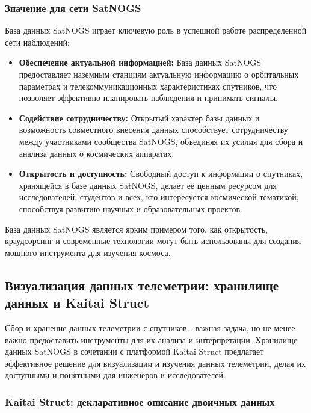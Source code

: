 \documentclass[12pt, a4paper]{extreport}
\begin{document}
\subsubsection{Значение для сети SatNOGS}

База данных SatNOGS играет ключевую роль в успешной работе распределенной сети наблюдений:

\begin{itemize}
\item \textbf{Обеспечение актуальной информацией:} База данных SatNOGS предоставляет наземным станциям актуальную информацию о орбитальных параметрах и телекоммуникационных характеристиках спутников, что позволяет эффективно планировать наблюдения и принимать сигналы.
\item \textbf{Содействие сотрудничеству:} Открытый характер базы данных и возможность совместного внесения данных способствует сотрудничеству между участниками сообщества SatNOGS, объединяя их усилия для сбора и анализа данных о космических аппаратах.
\item \textbf{Открытость и доступность:} Свободный доступ к информации о спутниках, хранящейся в базе данных SatNOGS, делает её ценным ресурсом для исследователей, студентов и всех, кто интересуется космической тематикой, способствуя развитию научных и образовательных проектов.
\end{itemize} 

База данных SatNOGS является ярким примером того, как открытость, краудсорсинг и современные технологии могут быть использованы для создания мощного инструмента для изучения космоса.

\subsection{Визуализация данных телеметрии: хранилище данных и Kaitai Struct}

Сбор и хранение данных телеметрии с  спутников - важная задача, но не менее важно  предоставить инструменты для их анализа и интерпретации.  Хранилище данных SatNOGS в сочетании с платформой Kaitai Struct предлагает  эффективное решение для визуализации и изучения данных телеметрии, делая их доступными и понятными для инженеров и исследователей.

\subsubsection{Kaitai Struct: декларативное описание двоичных данных}
\end{document}
